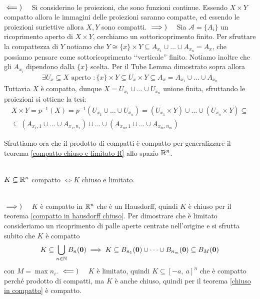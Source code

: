 \begin{demonstration}~{}\\
	$\impliedby)\quad $ Si considerino le proiezioni, che sono funzioni continue. Essendo $X\times Y$ compatto allora le immagini delle proiezioni saranno compatte, ed essendo le proiezioni suriettive allora $X,Y$ sono compatti. \newline
	$\implies)\quad $ Sia $\mathcal{A}=\{A_i\}$ un ricoprimento aperto di $X\times Y$, cerchiamo un sottoricoprimento finito.\newline
	Per sfruttare la compattezza di $Y$ notiamo che $Y\cong \{x\}\times Y\subseteq A_{x_1}\cup\dots\cup A_{x_n}=A_x$, che possiamo pensare come sottoricoprimento ‘‘verticale'' finito. Notiamo inoltre che gli $A_{x_i}$ dipendono dalla $\{x\}$ scelta.\newline
	Per il Tube Lemma dimostrato sopra allora
		\begin{gather*}
			\exists U_x\subseteq X \text{ aperto }\colon \{ x\}\times Y \subseteq U_x\times Y \subseteq A_x=A_{x_1}\cup\dots\cup A_{x_n}
		\end{gather*}
	Tuttavia $X$ è compatto, dunque $X=U_{x_1}\cup\dots\cup U_{x_n}$ unione finita, sfruttando le proiezioni si ottiene la tesi:
		\begin{gather*}
			X\times Y =p^{-1}(X)=p^{-1}\left( U_{x_1}\cup\dots\cup U_{x_n}\right)= (U_{x_1}\times Y)\cup\dots\cup (U_{x_n}\times Y)\subseteq \\
			\subseteq \left( A_{x_1 , 1}\cup\dots\cup A_{x_1, n_1}\right) \cup\dots\cup \left( A_{x_m, 1}\cup\dots\cup A_{x_m, n_m} \right)
		\end{gather*}
\end{demonstration}
Sfruttiamo ora che il prodotto di compatti è compatto per generalizzare il teorema \ref{compatto chiuso e limitato R} allo spazio $\mathbb{R} ^n$.
\begin{theorema}~{}\\ \label{compatto chiuso e limitato R^n}
	$K\subseteq \mathbb{R}^n$ compatto $\iff K$ chiuso e limitato.
\end{theorema}
\begin{demonstration}~{}\\
	$\implies)\quad$ $K$ è compatto in $\mathbb{R}^n$ che è un Hausdorff, quindi $K$ è chiuso per il teorema \ref{compatto in hausdorff chiuso}. Per dimostrare che è limitato  consideriamo un ricoprimento di palle aperte centrate nell'origine e si sfrutta subito che $K$ è compatto
		\begin{gather*}
			K\subseteq \mathop{{\bigcup}}\displaylimits_{n\in\mathbb{N}} B_n(\mathbf{0}) \implies K\subseteq B_{n_1}(\mathbf{0})\cup\dots\cup B_{n_m}(\mathbf{0}) \subseteq B_M (\mathbf{0})
		\end{gather*}
	con $M=\max n_i$.\newline
	$\impliedby)\quad$ $K$ è limitato, quindi $K\subseteq [-a,\ a]^n$ che è compatto perché prodotto di compatti, ma $K$ è anche chiuso, quindi per il teorema \ref{chiuso in compatto} è compatto.
\end{demonstration}
